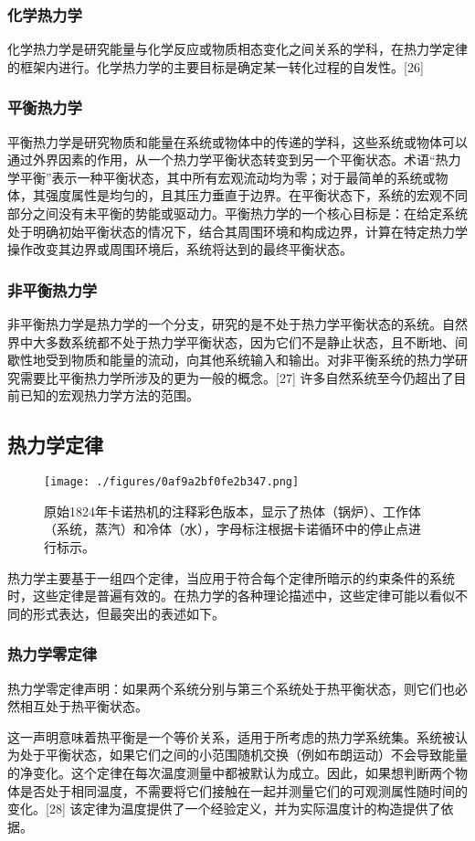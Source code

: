 \subsubsection{化学热力学}  
化学热力学是研究能量与化学反应或物质相态变化之间关系的学科，在热力学定律的框架内进行。化学热力学的主要目标是确定某一转化过程的自发性。[26]
\subsubsection{平衡热力学} 
平衡热力学是研究物质和能量在系统或物体中的传递的学科，这些系统或物体可以通过外界因素的作用，从一个热力学平衡状态转变到另一个平衡状态。术语“热力学平衡”表示一种平衡状态，其中所有宏观流动均为零；对于最简单的系统或物体，其强度属性是均匀的，且其压力垂直于边界。在平衡状态下，系统的宏观不同部分之间没有未平衡的势能或驱动力。平衡热力学的一个核心目标是：在给定系统处于明确初始平衡状态的情况下，结合其周围环境和构成边界，计算在特定热力学操作改变其边界或周围环境后，系统将达到的最终平衡状态。
\subsubsection{非平衡热力学}  
非平衡热力学是热力学的一个分支，研究的是不处于热力学平衡状态的系统。自然界中大多数系统都不处于热力学平衡状态，因为它们不是静止状态，且不断地、间歇性地受到物质和能量的流动，向其他系统输入和输出。对非平衡系统的热力学研究需要比平衡热力学所涉及的更为一般的概念。[27] 许多自然系统至今仍超出了目前已知的宏观热力学方法的范围。
\subsection{热力学定律}
\begin{figure}[ht]
\centering
\texttt{[image: ./figures/0af9a2bf0fe2b347.png]}
\caption{原始1824年卡诺热机的注释彩色版本，显示了热体（锅炉）、工作体（系统，蒸汽）和冷体（水），字母标注根据卡诺循环中的停止点进行标示。} \label{fig_RLX_2}
\end{figure}
热力学主要基于一组四个定律，当应用于符合每个定律所暗示的约束条件的系统时，这些定律是普遍有效的。在热力学的各种理论描述中，这些定律可能以看似不同的形式表达，但最突出的表述如下。
\subsubsection{热力学零定律}  
热力学零定律声明：如果两个系统分别与第三个系统处于热平衡状态，则它们也必然相互处于热平衡状态。

这一声明意味着热平衡是一个等价关系，适用于所考虑的热力学系统集。系统被认为处于平衡状态，如果它们之间的小范围随机交换（例如布朗运动）不会导致能量的净变化。这个定律在每次温度测量中都被默认为成立。因此，如果想判断两个物体是否处于相同温度，不需要将它们接触在一起并测量它们的可观测属性随时间的变化。[28] 该定律为温度提供了一个经验定义，并为实际温度计的构造提供了依据。

